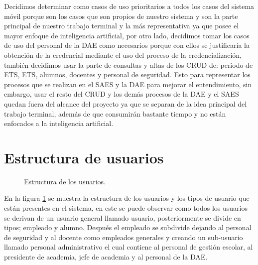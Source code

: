 Decidimos determinar como casos de uso prioritarios a todos los casos del sistema móvil porque son los casos que son propios de nuestro sistema y son la parte principal de nuestro trabajo terminal y la más representativa ya que posee el mayor enfoque de inteligencia artificial, por otro lado, decidimos tomar los casos de uso del personal de la DAE como necesarios porque con ellos se justificaría la obtención de la credencial mediante el uso del proceso de la credencialización, también decidimos usar la parte de consultas y altas de los CRUD de: periodo de ETS, ETS, alumnos, docentes y personal de seguridad. Esto para representar los procesos que se realizan en el SAES y la DAE para mejorar el entendimiento, sin embargo, usar el resto del CRUD y los demás procesos de la DAE y el SAES quedan fuera del alcance del proyecto ya que se separan de la idea principal del trabajo terminal, además de que consumirán bastante tiempo y no están enfocados a la inteligencia artificial.

\section{Estructura de usuarios }

\begin{figure}[htbp!]
	\begin{center}
		\caption{Estructura de los usuarios.}
		\label{fig:EstructuraU}
	\end{center}
\end{figure} 

En la figura \ref{fig:EstructuraU} se muestra la estructura de los usuarios y los tipos de usuario que están presentes en el sistema, en este se puede observar como todos los usuarios se derivan de un usuario general llamado usuario, posteriormente se divide en tipos; empleado y alumno. Después el empleado se subdivide dejando al personal de seguridad y al docente como empleados generales y creando un sub-usuario llamado personal administrativo el cual contiene al personal de gestión escolar, al presidente de academia, jefe de academia y al personal de la DAE. 

